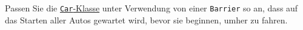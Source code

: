 \label{nebenlaufigkeit08}
Passen Sie die \hyperref[threads:lst:auto]{\lstinline$Car$-Klasse} unter Verwendung von einer
\lstinline$Barrier$ so an, dass auf das Starten aller Autos gewartet wird, bevor sie beginnen,
umher zu fahren.
